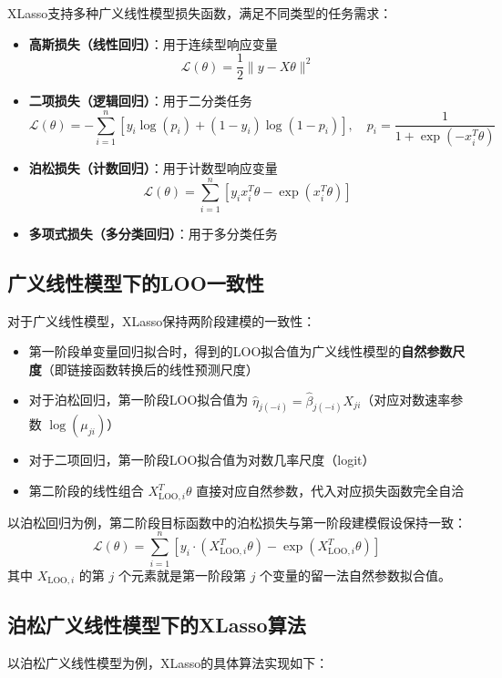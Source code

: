 \documentclass[12pt,a4paper]{article}
\begin{document}
XLasso支持多种广义线性模型损失函数，满足不同类型的任务需求：

\begin{itemize}
    \item \textbf{高斯损失（线性回归）}：用于连续型响应变量
    $$\mathcal{L}(\theta) = \frac{1}{2}\|y - X\theta\|^2$$
    \item \textbf{二项损失（逻辑回归）}：用于二分类任务
    $$\mathcal{L}(\theta) = -\sum_{i=1}^n [y_i \log(p_i) + (1-y_i)\log(1-p_i)], \quad p_i = \frac{1}{1+\exp(-x_i^T\theta)}$$
    \item \textbf{泊松损失（计数回归）}：用于计数型响应变量
    $$\mathcal{L}(\theta) = \sum_{i=1}^n [y_i x_i^T\theta - \exp(x_i^T\theta)]$$
    \item \textbf{多项式损失（多分类回归）}：用于多分类任务
\end{itemize}

\subsection{广义线性模型下的LOO一致性}
对于广义线性模型，XLasso保持两阶段建模的一致性：
\begin{itemize}
    \item 第一阶段单变量回归拟合时，得到的LOO拟合值为广义线性模型的\textbf{自然参数尺度}（即链接函数转换后的线性预测尺度）
    \item 对于泊松回归，第一阶段LOO拟合值为 $\hat{\eta}_{j(-i)} = \hat{\beta}_{j(-i)} X_{ji}$（对应对数速率参数 $\log(\mu_{ji})$）
    \item 对于二项回归，第一阶段LOO拟合值为对数几率尺度（logit）
    \item 第二阶段的线性组合 $X_{\text{LOO},i}^T \theta$ 直接对应自然参数，代入对应损失函数完全自洽
\end{itemize}

以泊松回归为例，第二阶段目标函数中的泊松损失与第一阶段建模假设保持一致：
$$\mathcal{L}(\theta) = \sum_{i=1}^n \left[ y_i \cdot (X_{\text{LOO},i}^T \theta) - \exp(X_{\text{LOO},i}^T \theta) \right]$$
其中 $X_{\text{LOO},i}$ 的第 $j$ 个元素就是第一阶段第 $j$ 个变量的留一法自然参数拟合值。

\subsection{泊松广义线性模型下的XLasso算法}
以泊松广义线性模型为例，XLasso的具体算法实现如下：
\end{document}
